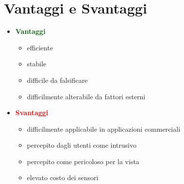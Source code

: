 \documentclass{report}
\begin{document}
\section{Vantaggi e Svantaggi}
\begin{itemize}
    \item \textcolor{darkgreen}{\textbf{Vantaggi}}
    \begin{itemize}
        \item efficiente 
        \item stabile 
        \item difficile da falsificare 
        \item difficilmente alterabile da fattori esterni 
    \end{itemize}
    \item \textcolor{red}{\textbf{Svantaggi}}
    \begin{itemize}
        \item difficilmente applicabile in applicazioni commerciali 
        \item percepito dagli utenti come intrusivo
        \item percepito come pericoloso per la vista 
        \item elevato costo dei sensori
    \end{itemize}
\end{itemize}
\end{document}
